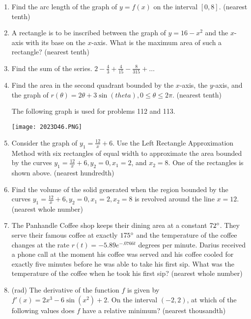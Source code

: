 \documentclass[../uilmath.tex]{subfiles}
\begin{document}
\begin{enumerate}[label=\bfseries\arabic*.]
    \item %
    Find the arc length of the graph of $y=f(x)$ on the interval $[0,8]$. (nearest tenth)

    \item %
    A rectangle is to be inscribed between the graph of $y=16-x^2$ and the $x$-axis with its base on the $x$-axis. What is the maximum area of such a rectangle? (nearest tenth)

    \item %
    Find the sum of the series. $2-\frac{4}{3}+\frac{4}{15}-\frac{8}{315}+\dots$

    \item %
    Find the area in the second quadrant bounded by the $x$-axis, the $y$-axis, and the graph of $r(\theta)=2\theta+3\sin(theta), 0\leq\theta\leq 2\pi$. (nearest tenth)


    The following graph is used for problems 112 and 113.
    \begin{center}
        \texttt{[image: 2023D46.PNG]}
    \end{center}
    \item %
    Consider the graph of $y_1 = \frac{12}{x}+6$. Use the Left Rectangle Approximation Method with six rectangles of equal width to approximate the area bounded by the curves 
    $y_1=\frac{12}{x}+6, y_2=0, x_1=2$, and $x_2=8$. One of the rectangles is shown above. (nearest hundredth)

    \item %
    Find the volume of the solid generated when the region bounded by the curves $y_1=\frac{12}{x}+6, y_2=0, x_1=2,x_2=8$ is revolved around the line $x=12$. (nearest whole number)

    \item %
    The Panhandle Coffee shop keeps their dining area at a constant $72\degree$. They serve their famous coffee at exactly $175\degree$ and the 
    temperature of the coffee changes at the rate $r(t)=-5.89e^{-.0766t}$ degrees per minute. Darius received a phone call at the moment his coffee was 
    served and his coffee cooled for exactly five minutes before he was able to take his first sip. What was the temperature of the coffee when he took his first sip? (nearest whole number)

    \item %
    (rad) The derivative of the function $f$ is given by $f'(x)=2x^3-6\sin(x^2)+2$. On the interval $(-2,2)$, at which of the following values does $f$ have a relative minimum? (nearest thousandth)


\end{enumerate}
\end{document}
